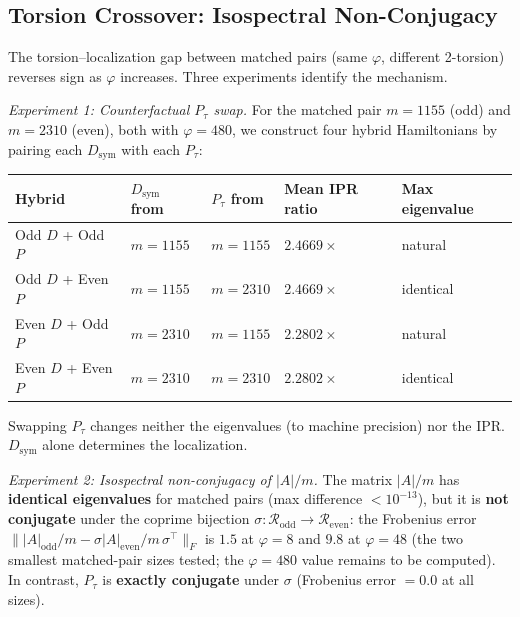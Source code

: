 \documentclass[11pt,letterpaper]{article}
\theoremstyle{definition}
\theoremstyle{remark}
\begin{document}
\subsection{Torsion Crossover: Isospectral Non-Conjugacy}\label{torsion-crossover-isospectral-non-conjugacy}

The torsion--localization gap between matched pairs (same $\varphi$, different 2-torsion) reverses sign as $\varphi$ increases. Three experiments identify the mechanism.

\emph{Experiment 1: Counterfactual $P_\tau$ swap.} For the matched pair $m = 1155$ (odd) and $m = 2310$ (even), both with $\varphi = 480$, we construct four hybrid Hamiltonians by pairing each $D_{\text{sym}}$ with each $P_\tau$:

\begin{longtable}[]{@{}
  >{\raggedright\arraybackslash}p{}
  >{\raggedright\arraybackslash}p{}
  >{\raggedright\arraybackslash}p{}
  >{\raggedright\arraybackslash}p{}
  >{\raggedright\arraybackslash}p{}@{}}
\toprule
Hybrid & $D_{\text{sym}}$ from & $P_\tau$ from & Mean IPR ratio & Max eigenvalue \\
\midrule
\endhead
\bottomrule
Odd $D$ + Odd $P$ & $m = 1155$ & $m = 1155$ & $2.4669\times$ & natural \\
Odd $D$ + Even $P$ & $m = 1155$ & $m = 2310$ & $2.4669\times$ & identical \\
Even $D$ + Odd $P$ & $m = 2310$ & $m = 1155$ & $2.2802\times$ & natural \\
Even $D$ + Even $P$ & $m = 2310$ & $m = 2310$ & $2.2802\times$ & identical \\
\end{longtable}

Swapping $P_\tau$ changes neither the eigenvalues (to machine precision) nor the IPR. $D_{\text{sym}}$ alone determines the localization.

\emph{Experiment 2: Isospectral non-conjugacy of $|A|/m$.} The matrix $|A|/m$ has \textbf{identical eigenvalues} for matched pairs (max difference $< 10^{-13}$), but it is \textbf{not conjugate} under the coprime bijection $\sigma: \mathcal{R}_{\text{odd}} \to \mathcal{R}_{\text{even}}$: the Frobenius error $\||A|_{\text{odd}}/m - \sigma |A|_{\text{even}}/m\, \sigma^\top\|_F$ is $1.5$ at $\varphi = 8$ and $9.8$ at $\varphi = 48$ (the two smallest matched-pair sizes tested; the $\varphi = 480$ value remains to be computed). In contrast, $P_\tau$ is \textbf{exactly conjugate} under $\sigma$ (Frobenius error $= 0.0$ at all sizes).
\end{document}

